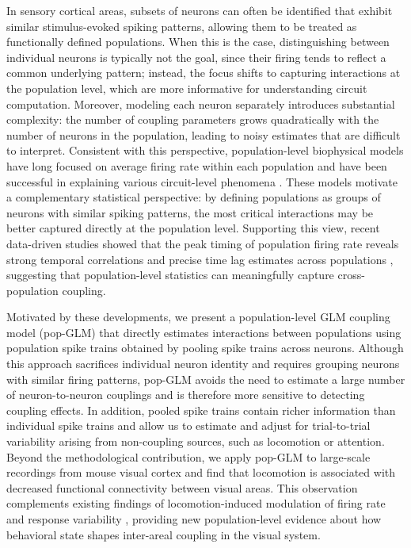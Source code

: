 \documentclass[12pt]{article}
\begin{document}
In sensory cortical areas, subsets of neurons can often be identified that exhibit similar stimulus-evoked spiking patterns, allowing them to be treated as functionally defined populations. When this is the case, distinguishing between individual neurons is typically not the goal, since their firing tends to reflect a common underlying pattern; instead, the focus shifts to capturing interactions at the population level, which are more informative for understanding circuit computation. Moreover, modeling each neuron separately introduces substantial complexity: the number of coupling parameters grows quadratically with the number of neurons in the population, leading to noisy estimates that are difficult to interpret. Consistent with this perspective, population-level biophysical models have long focused on average firing rate within each population and have been successful in explaining various circuit-level phenomena \cite{gerstner2014neuronal, wilson1972excitatory, wilson1973mathematical, joglekar2018inter}. These models motivate a complementary statistical perspective: by defining populations as groups of neurons with similar spiking patterns, the most critical interactions may be better captured directly at the population level. Supporting this view, recent data-driven studies showed that the peak timing of population firing rate reveals strong temporal correlations and precise time lag estimates across populations \cite{chen2022population, olarinre2025relative}, suggesting that population-level statistics can meaningfully capture cross-population coupling.

Motivated by these developments, we present a population-level GLM coupling model (pop-GLM) that directly estimates interactions between populations using population spike trains obtained by pooling spike trains across neurons. Although this approach sacrifices individual neuron identity and requires grouping neurons with similar firing patterns, pop-GLM avoids the need to estimate a large number of neuron-to-neuron couplings and is therefore more sensitive to detecting coupling effects. In addition, pooled spike trains contain richer information than individual spike trains and allow us to estimate and adjust for trial-to-trial variability arising from non-coupling sources, such as locomotion or attention. Beyond the methodological contribution, we apply pop-GLM to large-scale recordings from mouse visual cortex and find that locomotion is associated with decreased functional connectivity between visual areas. This observation complements existing findings of locomotion-induced modulation of firing rate and response variability \cite{niell2010modulation, keller2012sensorimotor, lecoq2014visualizing, andermann2011functional, ayaz2013locomotion, bennett2013subthreshold, polack2013cellular, fu2014VIP, vinck2015arousal, dadarlat2017locomotion, pillow2022reduced, glickfeld2017higher}, providing new population-level evidence about how behavioral state shapes inter-areal coupling in the visual system.
\end{document}
